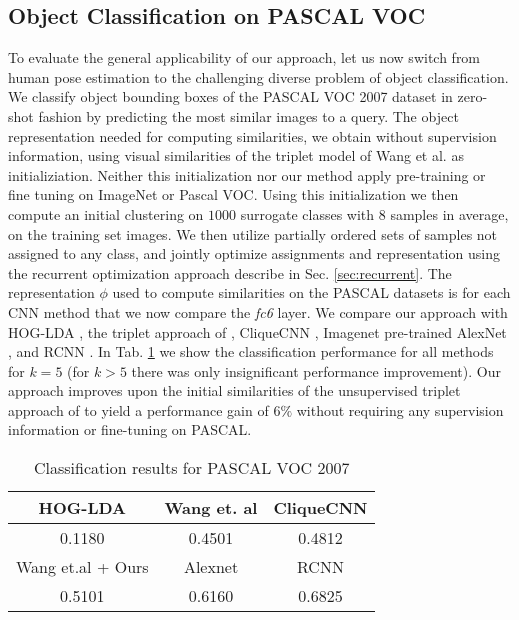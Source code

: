 \documentclass[10pt,twocolumn,letterpaper]{article}
\begin{document}
\subsection{Object Classification on PASCAL VOC}
To evaluate the general applicability of our approach, let us now switch from human pose estimation to the challenging diverse problem of object classification.
We classify object bounding boxes of the PASCAL VOC 2007 \cite{voc} dataset in zero-shot fashion by predicting the most similar images to a query. The object representation needed for computing similarities, we obtain without supervision information, using visual similarities of the triplet model of Wang et al. \cite{ConvNetpretext2} as initializiation. Neither this initialization nor our method apply pre-training or fine tuning on ImageNet or Pascal VOC. Using this initialization we then compute an initial clustering on  $1000$ surrogate classes with $8$ samples in average, on the training set images. We then utilize partially ordered sets of samples not assigned to any class, and jointly optimize assignments and representation using the recurrent optimization approach describe in Sec. \ref{sec:recurrent}. The representation $\phi$ used to compute similarities on the PASCAL datasets is for each CNN method that we now compare the \emph{fc6} layer.
We compare our approach with HOG-LDA \cite{hoglda}, the triplet approach of \cite{ConvNetpretext2}, CliqueCNN \cite{cliquecnn}, Imagenet pre-trained AlexNet \cite{alexnet}, and RCNN \cite{rcnn}. In Tab. \ref{tab:results_voc} we show the classification performance for all methods for $k=5$ (for $k>5$ there was only insignificant performance improvement). Our approach improves upon the initial similarities of the unsupervised triplet approach of \cite{ConvNetpretext2} to yield a performance gain of $6\%$ without requiring any supervision information or fine-tuning on PASCAL.

\begin{table}[!h]
    \scriptsize
    \centering
    \begin{tabular}{|c |c| c|}
    \hline
    HOG-LDA & Wang et. al \cite{ConvNetpretext2} & CliqueCNN\cite{cliquecnn}\\  
    \hline
    0.1180 &  0.4501 & 0.4812 \\
    \hline\hline
    Wang et.al \cite{ConvNetpretext2} + Ours & Alexnet \cite{alexnet} & RCNN \cite{rcnn}\\
    \hline
    0.5101 &0.6160 & 0.6825 \\
    \hline
    \end{tabular}
    \caption{Classification results for PASCAL VOC 2007}
    \label{tab:results_voc}
\end{table}
\end{document}

